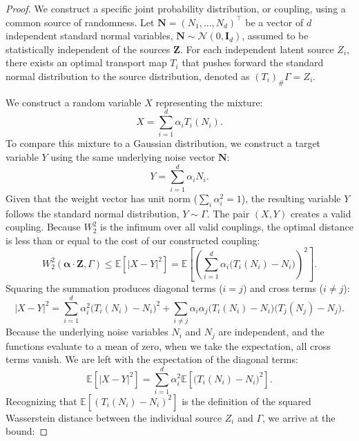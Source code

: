 \documentclass[accepted]{tpm2026} %
\begin{document}
\begin{proof}
     We construct a specific joint probability distribution, or coupling, using a common source of randomness. 
Let $\mathbf{N} = (N_1, \dots, N_d)^\top$ be a vector of $d$ independent standard normal variables, $\mathbf{N} \sim \mathcal{N}(0, \mathbf{I}_d)$, 
assumed to be statistically independent of the sources $\mathbf{Z}$. For each independent latent source $Z_i$, there exists 
an optimal transport map $T_i$ that pushes forward the standard normal distribution to the source distribution, denoted as $(T_i)_{\#} \Gamma = Z_i$. 

We construct a random variable $X$ representing the mixture:
\begin{equation}
    X = \sum_{i=1}^d \alpha_i T_i(N_i).
\end{equation}
To compare this mixture to a Gaussian distribution, we construct a target variable $Y$ using the same underlying noise vector $\mathbf{N}$:
\begin{equation}
    Y = \sum_{i=1}^d \alpha_i N_i.
\end{equation}
Given that the weight vector has unit norm ($\sum_i \alpha_i^2 = 1$), the resulting variable $Y$ follows the standard normal distribution, $Y \sim \Gamma$. 
The pair $(X, Y)$ creates a valid coupling. Because $W_2^2$ is the infimum over all valid couplings, the optimal distance is less than or equal to the cost of our constructed coupling:
\begin{equation}
    W_2^2(\mathbf{\alpha} \cdot \mathbf{Z}, \Gamma) \le \mathbb{E}\left[|X - Y|^2\right] = \mathbb{E}\left[ \left( \sum_{i=1}^d \alpha_i \big(T_i(N_i) - N_i\big) \right)^2 \right].
\end{equation}
Squaring the summation produces diagonal terms ($i=j$) and cross terms ($i \neq j$):
\begin{equation}
    |X - Y|^2 = \sum_{i=1}^d \alpha_i^2 \big(T_i(N_i) - N_i\big)^2 + \sum_{i \neq j} \alpha_i \alpha_j \big(T_i(N_i) - N_i\big)\big(T_j(N_j) - N_j\big).
\end{equation}
Because the underlying noise variables $N_i$ and $N_j$ are independent, and the functions evaluate to a mean of zero, when we take the expectation, 
all cross terms vanish. We are left with the expectation of the diagonal terms:
\begin{equation}
    \mathbb{E}\left[|X - Y|^2\right] = \sum_{i=1}^d \alpha_i^2 \mathbb{E}\left[ \big(T_i(N_i) - N_i\big)^2 \right].
\end{equation}
Recognizing that $\mathbb{E}[ (T_i(N_i) - N_i)^2 ]$ is the definition of the squared Wasserstein distance between the individual source $Z_i$ and $\Gamma$, we arrive at the bound:

\end{proof}
\end{document}
